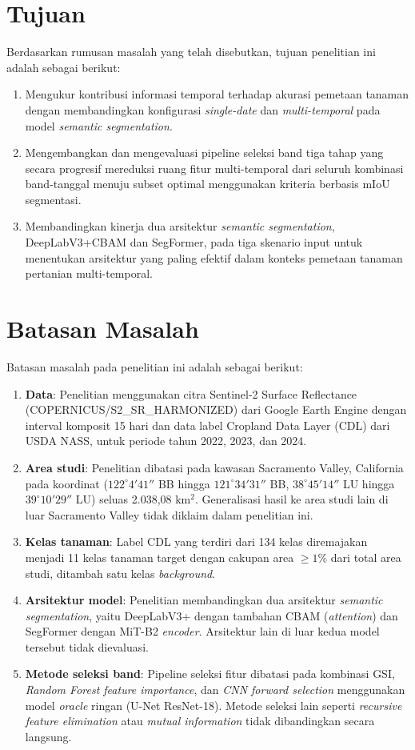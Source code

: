 \section{Tujuan}
Berdasarkan rumusan masalah yang telah disebutkan, tujuan penelitian ini adalah sebagai berikut:
\begin{enumerate}
    \item Mengukur kontribusi informasi temporal terhadap akurasi pemetaan tanaman dengan membandingkan konfigurasi \textit{single-date} dan \textit{multi-temporal} pada model \textit{semantic segmentation}.
    \item Mengembangkan dan mengevaluasi pipeline seleksi band tiga tahap yang secara progresif mereduksi ruang fitur multi-temporal dari seluruh kombinasi band-tanggal menuju subset optimal menggunakan kriteria berbasis mIoU segmentasi.
    \item Membandingkan kinerja dua arsitektur \textit{semantic segmentation}, DeepLabV3+CBAM dan SegFormer, pada tiga skenario input untuk menentukan arsitektur yang paling efektif dalam konteks pemetaan tanaman pertanian multi-temporal.
\end{enumerate}

\section{Batasan Masalah}
Batasan masalah pada penelitian ini adalah sebagai berikut:
\begin{enumerate}
    \item \textbf{Data}: Penelitian menggunakan citra Sentinel-2 Surface Reflectance (COPERNICUS/S2\_SR\_HARMONIZED) dari Google Earth Engine dengan interval komposit 15 hari dan data label Cropland Data Layer (CDL) dari USDA NASS, untuk periode tahun 2022, 2023, dan 2024.
    \item \textbf{Area studi}: Penelitian dibatasi pada kawasan Sacramento Valley, California pada koordinat ($122^{\circ}4'41''$ BB hingga $121^{\circ}34'31''$ BB, $38^{\circ}45'14''$ LU hingga $39^{\circ}10'29''$ LU) seluas 2.038,08 km$^2$. Generalisasi hasil ke area studi lain di luar Sacramento Valley tidak diklaim dalam penelitian ini.
    \item \textbf{Kelas tanaman}: Label CDL yang terdiri dari 134 kelas diremajakan menjadi 11 kelas tanaman target dengan cakupan area $\geq 1\%$ dari total area studi, ditambah satu kelas \textit{background}.
    \item \textbf{Arsitektur model}: Penelitian membandingkan dua arsitektur \textit{semantic segmentation}, yaitu DeepLabV3+ dengan tambahan CBAM (\textit{attention}) dan SegFormer dengan MiT-B2 \textit{encoder}. Arsitektur lain di luar kedua model tersebut tidak dievaluasi.
    \item \textbf{Metode seleksi band}: Pipeline seleksi fitur dibatasi pada kombinasi GSI, \textit{Random Forest feature importance}, dan \textit{CNN forward selection} menggunakan model \textit{oracle} ringan (U-Net ResNet-18). Metode seleksi lain seperti \textit{recursive feature elimination} atau \textit{mutual information} tidak dibandingkan secara langsung.
\end{enumerate}

